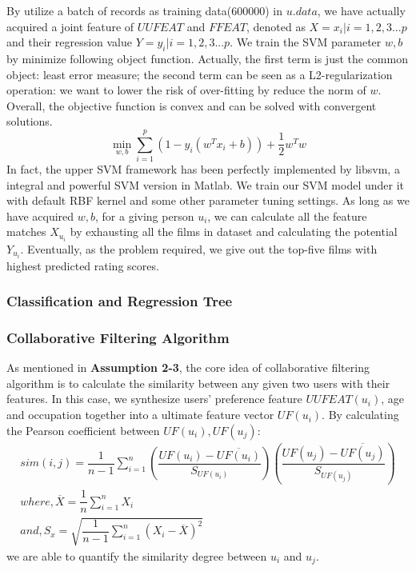 By utilize a batch of records as training data(600000) in $u.data$, we have actually acquired a joint feature of $UUFEAT$ and $FFEAT$, denoted as $\textit{X}={x_{i}|i=1,2,3...p}$ and their regression value $\textit{Y}={y_{i}|i=1,2,3...p}$. We train the SVM parameter $w,b$ by minimize following object function. Actually, the first term is just the common object: least error measure; the second term can be seen as a L2-regularization operation: we want to lower the risk of over-fitting by reduce the norm of $w$. Overall, the objective function is convex and can be solved with convergent solutions.
\begin{equation}
\min _{w,b}\sum ^{p}_{i=1}\left( 1-y_{i}\left( w^{T}x_{i}+b\right) \right) +\dfrac {1}{2}w^{T}w
\end{equation}
In fact, the upper SVM framework has been perfectly implemented by libsvm\cite{chang2011libsvm}, a integral and powerful SVM version in Matlab. We train our SVM model under it with default RBF kernel\cite{chung2003radius} and some other parameter tuning settings. As long as we have acquired $w,b$, for a giving person $u_{i}$, we can calculate all the feature matches $X_{u_{i}}$ by exhausting all the films in dataset and calculating the potential $Y_{u_{i}}$. Eventually, as the problem required, we give out the top-five films with highest predicted rating scores.

\subsubsection{Classification and Regression Tree}
\subsubsection{Collaborative Filtering Algorithm}
As mentioned in \textbf{Assumption 2-3}, the core idea of collaborative filtering algorithm\cite{breese1998empirical} is to calculate the similarity between any given two users with their features. In this case, we synthesize users' preference feature $UUFEAT(u_{i})$, age and occupation together into a ultimate feature vector $UF(u_{i})$. By calculating the Pearson coefficient\cite{hane1993pearson} between $UF(u_{i}), UF(u_{j})$:
\begin{eqnarray}
sim\left(i,j\right) =\dfrac {1}{n-1}\sum ^{n}_{i=1}\left( \dfrac {UF(u_{i})-\overline {UF(u_{i})}}{S_{UF(u_{i})}}\right) \left( \dfrac {UF(u_{j})-\overline {UF(u_{j})}}{S_{UF(u_{j})}}\right) \\
where, \overline {X}=\dfrac {1}{n}\sum ^{n}_{i=1}X_{i} \nonumber \\ 
and, S_{x}=\sqrt {\dfrac {1}{n-1}\sum ^{n}_{i=1}\left( X_{i}-\overline {X}\right) ^{2}} \nonumber 
\end{eqnarray}
we are able to quantify the similarity degree between $u_{i}$ and $u_{j}$.

